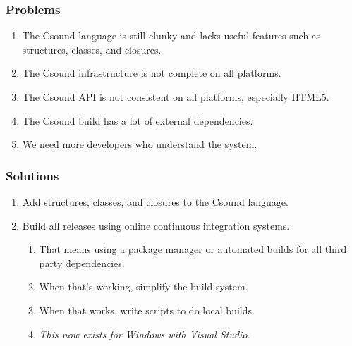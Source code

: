 \documentclass{beamer}
\begin{document}
\begin{frame}[allowframebreaks]
    \frametitle<presentation>{Problems}
    \begin{enumerate}
        \item     
            The Csound language is still clunky and lacks useful features such 
as structures, classes, and closures.
        \item
            The Csound infrastructure is not complete on all platforms.
        \item
            The Csound API is not consistent on all platforms, especially 
HTML5.
        \item
            The Csound build has a lot of external dependencies.
        \item
            We need more developers who understand the system.
    \end{enumerate}    
\end{frame}

\begin{frame}[allowframebreaks]
    \frametitle<presentation>{Solutions}
    \begin{enumerate}
        \item     
            Add structures, classes, and closures to the Csound language.
        \item
            Build all releases using online continuous integration systems.
                \begin{enumerate}
                    \item That means using a package manager or automated 
builds for all third party dependencies.
                \item
                    When that's working, simplify the build system.
                \item
                    When that works, write scripts to do local builds.
                \item
                    \textit{This now exists for Windows with Visual Studio.}
                \end{enumerate}
    \end{enumerate}    
\end{frame}
\end{document}
